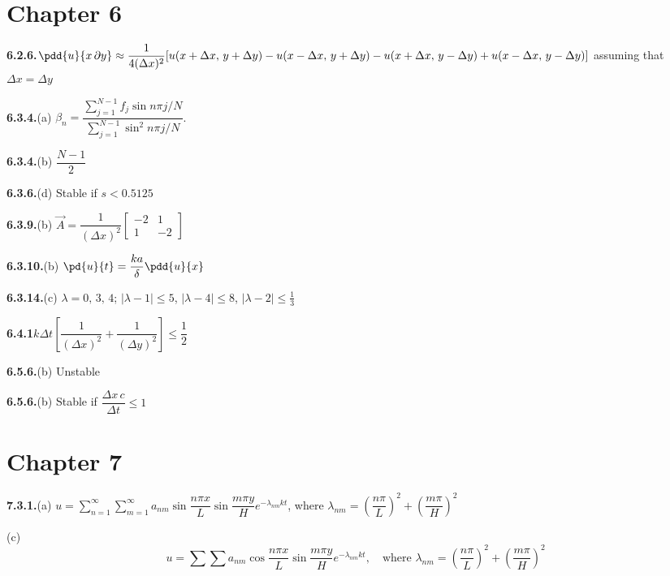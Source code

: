 \section*{Chapter 6}

\textbf{6.2.6.}\quad $\pdd{u}{x\,\partial y} \approx \dfrac{1}{4(\Delta x)^2}[u(x+\Delta x,\,y+\Delta y)-u(x-\Delta x,\,y+\Delta y)-u(x+\Delta x,\,y-\Delta y)+u(x-\Delta x,\,y-\Delta y)]$ assuming that $\Delta x = \Delta y$

\medskip
\textbf{6.3.4.}\quad (a) $\beta_n = \dfrac{\sum_{j=1}^{N-1}f_j\sin n\pi j/N}{\sum_{j=1}^{N-1}\sin^2 n\pi j/N}$.

\medskip
\textbf{6.3.4.}\quad (b) $\dfrac{N-1}{2}$

\medskip
\textbf{6.3.6.}\quad (d) Stable if $s < 0.5125$

\medskip
\textbf{6.3.9.}\quad (b) $\vec{A} = \dfrac{1}{(\Delta x)^2}\begin{bmatrix} -2 & 1 \\ 1 & -2 \end{bmatrix}$

\medskip
\textbf{6.3.10.}\quad (b) $\pd{u}{t} = \dfrac{ka}{\delta}\pdd{u}{x}$

\medskip
\textbf{6.3.14.}\quad (c) $\lambda = 0,\,3,\,4$; $|\lambda-1|\leq 5$, $|\lambda-4|\leq 8$, $|\lambda-2|\leq\frac{1}{3}$

\medskip
\textbf{6.4.1}\quad $k\Delta t\left[\dfrac{1}{(\Delta x)^2}+\dfrac{1}{(\Delta y)^2}\right]\leq\dfrac{1}{2}$

\medskip
\textbf{6.5.6.}\quad (b) Unstable

\medskip
\textbf{6.5.6.}\quad (b) Stable if $\dfrac{\Delta x\,c}{\Delta t}\leq 1$%

\section*{Chapter 7}

\textbf{7.3.1.}\quad (a) $u = \sum_{n=1}^{\infty}\sum_{m=1}^{\infty} a_{nm}\sin\dfrac{n\pi x}{L}\sin\dfrac{m\pi y}{H}e^{-\lambda_{nm}kt}$,
where $\lambda_{nm} = \left(\dfrac{n\pi}{L}\right)^2+\left(\dfrac{m\pi}{H}\right)^2$

\quad (c)
\[
u = \sum\sum a_{nm}\cos\dfrac{n\pi x}{L}\sin\dfrac{m\pi y}{H}e^{-\lambda_{nm}kt},\quad\text{where } \lambda_{nm} = \left(\dfrac{n\pi}{L}\right)^2+\left(\dfrac{m\pi}{H}\right)^2
\]

